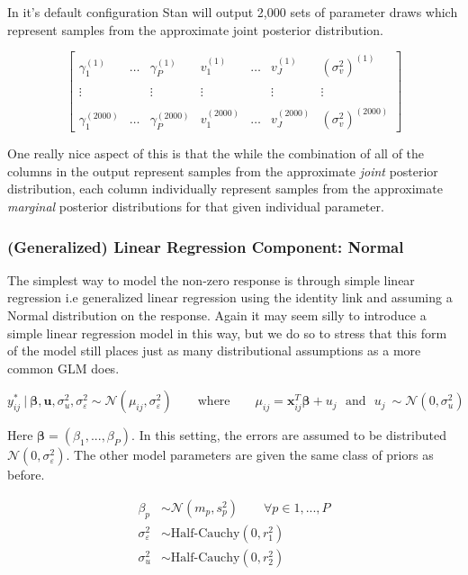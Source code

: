 \documentclass[12pt,twoside]{reedthesis}
\begin{document}
In it's default configuration Stan will output 2,000 sets of parameter draws which represent samples from the approximate joint posterior distribution.

\[
\begin{bmatrix}
  \gamma_1^{(1)} & \dots & \gamma_P^{(1)} & v_1^{(1)} & \dots & v_J^{(1)}  & (\sigma_{v}^2)^{(1)} \\
  \\ \vdots   &  & \vdots  & \vdots & &  \vdots & \vdots  \\ \\
  \gamma_1^{(2000)} & \dots &\gamma_P^{(2000)} & v_1^{(2000)}& \dots & v_J^{(2000)} & (\sigma_{v}^2)^{(2000)}
\end{bmatrix}
\]

One really nice aspect of this is that the while the combination of all of the columns in the output represent samples from the approximate \emph{joint} posterior distribution, each column individually represent samples from the approximate \emph{marginal} posterior distributions for that given individual parameter.

\hypertarget{bayeslin}{%
\subsubsection{(Generalized) Linear Regression Component: Normal}\label{bayeslin}}

The simplest way to model the non-zero response is through simple linear regression i.e generalized linear regression using the identity link and assuming a Normal distribution on the response. Again it may seem silly to introduce a simple linear regression model in this way, but we do so to stress that this form of the model still places just as many distributional assumptions as a more common GLM does.

\[
y^*_{ij} \ | \ \boldsymbol{\beta}, \boldsymbol{u}, \sigma_{u}^2,  \sigma_{\varepsilon}^2 \sim \mathcal{N}(\mu_{ij}, \sigma_{\varepsilon}^2) \qquad \text{where} \qquad \mu_{ij} = \mathbf{x}_{ij}^T\boldsymbol{\beta} + u_j \ \ \ \text{and} \ \ \ u_j \  \sim \mathcal{N}(0, \sigma_{u}^2)
\]

Here \(\boldsymbol{\beta} = (\beta_1, ..., \beta_P)\). In this setting, the errors are assumed to be distributed \(\mathcal{N}(0, \sigma_{\varepsilon}^2)\). The other model parameters are given the same class of priors as before.

\[
\begin{aligned}
\beta_p &\sim \mathcal{N}(m_p, s_p^2)  \qquad \forall p\in 1, ..., P \\
\sigma_{\varepsilon}^2 &\sim \text{Half-Cauchy}(0, r_1^2) \\
\sigma_{u}^2 &\sim \text{Half-Cauchy}(0, r_2^2)
\end{aligned}
\]
\end{document}
